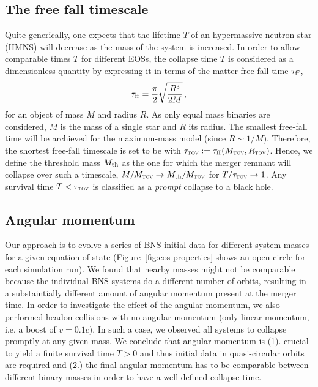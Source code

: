 \subsection{The free fall timescale}
Quite generically, one expects that the lifetime $T$ of an hypermassive neutron
star (HMNS) will decrease as the mass of the system is increased. In order to
allow comparable times $T$ for different EOSs, the collapse time $T$ is 
considered as a dimensionless quantity by expressing it in terms of the
matter free-fall time
$\tau_{\rm ff}$, \ie \cite{Rezzolla_book:2013}
\begin{equation}
\tau_{\rm ff} = \frac \pi 2 \sqrt{\frac{R^3}{2M} } \,,
\end{equation}
for an object of mass $M$ and radius $R$. As only equal mass binaries are
considered, $M$ is the mass of a single star and $R$ its radius. The smallest
free-fall time will be archieved for the maximum-mass model (since
$R\sim 1/M$). Therefore, the shortest free-fall timescale is set to be with
$\tau_{\textsc{tov}} := \tau_{\rm ff} (M_{\textsc{tov}}, R_{\textsc{tov}})$.
Hence, we define the threshold mass $M_{\rm th}$
as the one for which the merger remnant will collapse over such a
timescale, \ie $M/M_{\textsc{tov}} \to M_{\rm th}/M_{\textsc{tov}}$ for
$T/\tau_{\textsc{tov}} \to 1$.
Any survival time $T < \tau_{\textsc{tov}}$ is classified as a \emph{prompt} collapse to
a black hole.

\subsection{Angular momentum}
Our approach is to evolve a series of BNS initial data for different system
masses for a given equation of state (Figure~\ref{fig:eos-properties} shows
an open circle for each simulation run). We found that nearby masses might not
be comparable because the individual BNS systems do a different number
of orbits, resulting in a substaintially different amount of
angular momentum present at the merger time. In order to investigate the effect 
of the angular momentum, we also performed headon collisions with no angular
momentum (only linear momentum, i.e. a boost of $v=0.1c$). In such a case,
we observed all systems to collapse promptly at any given mass. We conclude
that angular momentum is (1). crucial to yield a finite survival time $T>0$
and thus initial data in quasi-circular orbits are required and (2.) the final
angular momentum has to be comparable between different binary masses in order
to have a well-defined collapse time.


